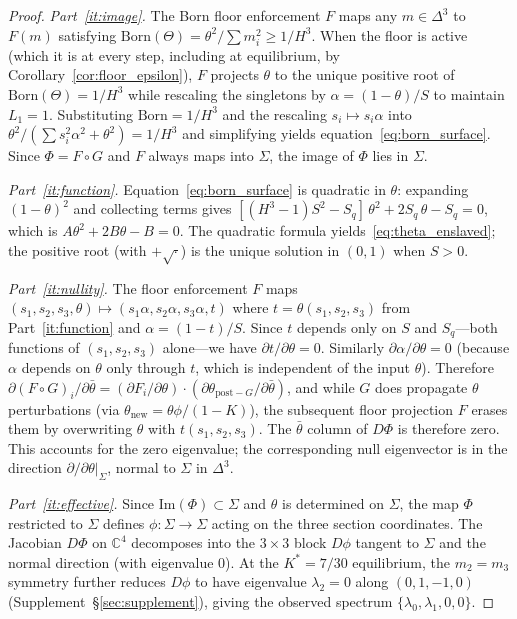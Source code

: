 \documentclass[11pt,a4paper]{article}
\theoremstyle{definition}
\theoremstyle{remark}
\newcommand{\C}{\mathbb{C}}
\begin{document}
\begin{proof}
\emph{Part~\ref{it:image}.} The Born floor enforcement $F$ maps any $m\in\Delta^3$ to $F(m)$ satisfying $\mathrm{Born}(\Theta)=\theta^2/\sum m_i^2\geq 1/H^3$. When the floor is active (which it is at every step, including at equilibrium, by Corollary~\ref{cor:floor_epsilon}), $F$ projects $\theta$ to the unique positive root of $\mathrm{Born}(\Theta)=1/H^3$ while rescaling the singletons by $\alpha=(1-\theta)/S$ to maintain $L_1=1$. Substituting $\mathrm{Born}=1/H^3$ and the rescaling $s_i\mapsto s_i\alpha$ into $\theta^2/(\sum s_i^2\alpha^2+\theta^2)=1/H^3$ and simplifying yields equation~\eqref{eq:born_surface}. Since $\Phi=F\circ G$ and $F$ always maps into $\Sigma$, the image of $\Phi$ lies in $\Sigma$.

\emph{Part~\ref{it:function}.} Equation~\eqref{eq:born_surface} is quadratic in $\theta$: expanding $(1-\theta)^2$ and collecting terms gives $[(H^3\!-\!1)S^2-S_q]\,\theta^2+2S_q\,\theta-S_q=0$, which is $A\theta^2+2B\theta-B=0$. The quadratic formula yields~\eqref{eq:theta_enslaved}; the positive root (with $+\sqrt{\cdot}$) is the unique solution in $(0,1)$ when $S>0$.

\emph{Part~\ref{it:nullity}.} The floor enforcement $F$ maps $(s_1,s_2,s_3,\theta)\mapsto(s_1\alpha,s_2\alpha,s_3\alpha,t)$ where $t=\theta(s_1,s_2,s_3)$ from Part~\ref{it:function} and $\alpha=(1-t)/S$. Since $t$ depends only on $S$ and $S_q$---both functions of $(s_1,s_2,s_3)$ alone---we have $\partial t/\partial\theta=0$. Similarly $\partial\alpha/\partial\theta=0$ (because $\alpha$ depends on $\theta$ only through $t$, which is independent of the input $\theta$). Therefore $\partial(F\circ G)_i/\partial\bar{\theta}=(\partial F_i/\partial\theta)\cdot(\partial\theta_{\mathrm{post-}G}/\partial\bar{\theta})$, and while $G$ does propagate $\theta$ perturbations (via $\theta_\mathrm{new}=\theta\phi/(1-K)$), the subsequent floor projection $F$ erases them by overwriting $\theta$ with $t(s_1,s_2,s_3)$. The $\bar{\theta}$ column of $D\Phi$ is therefore zero. This accounts for the zero eigenvalue; the corresponding null eigenvector is in the direction $\partial/\partial\theta|_\Sigma$, normal to $\Sigma$ in $\Delta^3$.

\emph{Part~\ref{it:effective}.} Since $\mathrm{Im}(\Phi)\subset\Sigma$ and $\theta$ is determined on $\Sigma$, the map $\Phi$ restricted to $\Sigma$ defines $\phi:\Sigma\to\Sigma$ acting on the three section coordinates. The Jacobian $D\Phi$ on $\C^4$ decomposes into the $3\times 3$ block $D\phi$ tangent to $\Sigma$ and the normal direction (with eigenvalue $0$). At the $K^*=7/30$ equilibrium, the $m_2=m_3$ symmetry further reduces $D\phi$ to have eigenvalue $\lambda_2=0$ along $(0,1,-1,0)$ (Supplement~\S\ref{sec:supplement}), giving the observed spectrum $\{\lambda_0,\lambda_1,0,0\}$.
\end{proof}
\end{document}
